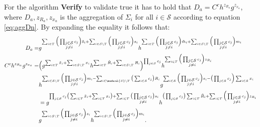For the algorithm \textbf{Verify} to validate true it has to hold that $D_a=C^ch^{z_{R_a}}g^{z_{x_a}}$, where $D_a,z_{R_a},z_{x_a}$ is the aggregation of $\Sigma_i$ for all $i\in\mathcal{S}$  according to equation \eqref{eq:aggDn}. By expanding the equality it follows that:
\begin{align*}
D_a =& g ^ {\sum_{i\in T } \Big(\prod_{\substack{j\in\mathcal{S}\\ j\neq i}}   c_j \Big)\tilde{s}_i + \sum_{i\in\mathcal{S}\backslash T } \Big(\prod_{\substack{j\in\mathcal{S}\\ j\neq i}}   c_j \Big)s_i} h^ {\sum_{i\in T } \Big(\prod_{\substack{j\in\mathcal{S}\\ j\neq i}}    c_j \Big)\tilde{m}_i+ \sum_{i\in\mathcal{S}\backslash T} \Big(\prod_{\substack{j\in\mathcal{S}\\ j\neq i}}    c_j \Big)m_i} 
 \\
 C^ch^{z_{R_a}}g^{z_{x_a}} =&   \Big( g^{\sum_{i\in T} \tilde{x}_i + \sum_{i\in \mathcal{S}\backslash T} x_i} h^{\sum_{i\in T} \tilde{R}_i + \sum_{i\in \mathcal{S}\backslash T} R_i}  \Big) ^{\prod_{j\in\mathcal{S}} c_j}  h^{ \sum_{i\in T } \Big( \prod_{\substack{j\in\mathcal{S}\\ j\neq i}} c_j \Big) z_{R_i}}
 \\
& h^{\sum_{i\in\mathcal{S}\backslash T } \Big( \prod_{\substack{j\in\mathcal{S}\\ j\neq i}}   c_j \Big)m_i- \sum_{i\in\marhcal{S}\backslash T} \big( \sum_{i\in\mathcal{S}} c_j\big)R_i}  
g^{ \sum_{i\in\mathcal{S}} \Big( \prod_{\substack{j\in\mathcal{S}\\ j\neq i}}   c_j \Big)s_i - \big( \prod_{j\in\mathcal{S}} c_j \Big) \sum_{i\in\mathcal{S}} x_i}
\\ 
 &=  g ^{\prod_{j\in\mathcal{S}} c_j \big(\sum_{i\in T} \tilde{x}_i + \sum_{i\in T} x_i\big) +  \sum_{i\in T} \big( \prod_{\substack{j\in\mathcal{S}\\ j\neq i}} c_j\big) s_i     } h^{ \big( \prod_{j\in\mathcal{S}} c_j\big)\sum_{i\in T} \tilde{R}_i  + \sum_{i\in T } \Big( \prod_{\substack{j\in\mathcal{S}\\ j\neq i}} c_j \Big) z_{R_i}}
 \\
 & g ^ {\sum_{i\in\mathcal{S}\backslash T } \Big(\prod_{\substack{j\in\mathcal{S}\\ j\neq i}}   c_j \Big)s_i} h^ { \sum_{i\in\mathcal{S}\backslash T} \Big(\prod_{\substack{j\in\mathcal{S}\\ j\neq i}}    c_j \Big)m_i} .
\end{align*}
